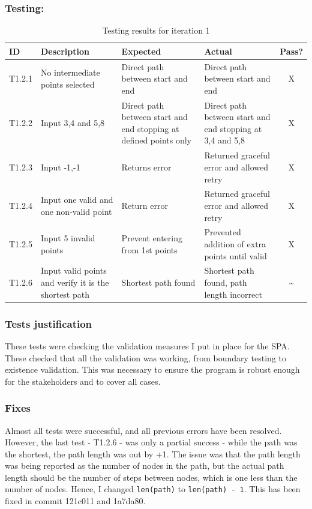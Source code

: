 \subsubsection{Testing:}
\begin{table}[htbp]
\centering
\begin{tabularx}{\textwidth}{|l|X|p{3.5cm}|p{3.5cm}|c|}
\hline
\textbf{ID} & \textbf{Description} & \textbf{Expected} & \textbf{Actual} & \textbf{Pass?} \\
\hline
T1.2.1 & No intermediate points selected & Direct path between start and end & Direct path between start and end & X \\
\hline
T1.2.2 & Input 3,4 and 5,8 & Direct path between start and end stopping at defined points only & Direct path between start and end stopping at 3,4 and 5,8 & X \\
\hline
T1.2.3 & Input -1,-1 & Returns error & Returned graceful error and allowed retry & X \\
\hline
T1.2.4 & Input one valid and one non-valid point & Return error & Returned graceful error and allowed retry & X \\
\hline
T1.2.5 & Input 5 invalid points & Prevent entering from 1st points & Prevented addition of extra points until valid & X \\
\hline
T1.2.6 & Input valid points and verify it is the shortest path & Shortest path found & Shortest path found, path length incorrect & \~{} \\
\hline

\end{tabularx}
\caption{Testing results for iteration 1}
\end{table}

\subsubsection{Tests justification}
These tests were checking the validation measures I put in place for the SPA. These checked that all the validation was working, from boundary testing to existence validation. This was necessary to ensure the program is robust enough for the stakeholders and to cover all cases.


\subsubsection{Fixes}
Almost all tests were successful, and all previous errors have been resolved. However, the last test - T1.2.6 - was only a partial success - while the path was the shortest, the path length was out by +1. The issue was that the path length was being reported as the number of nodes in the path, but the actual path length should be the number of steps between nodes, which is one less than the number of nodes. Hence, I changed \verb|len(path)| to \verb|len(path) - 1|. This has been fixed in commit 121c011 and 1a7da80.

